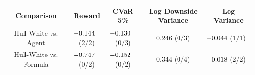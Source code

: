 \begingroup
\renewcommand{\arraystretch}{1.18}
\setlength{\tabcolsep}{7pt}
\begin{tabular}{@{}ccccc@{}}
\toprule
Comparison & Reward & CVaR 5\% & Log Downside Variance & Log Variance \\
\midrule
Hull-White vs. Agent & $\mathllap{-}0.144$ (2/2) & $\mathllap{-}0.130$ (0/3) & $0.246$ (0/3) & $\mathllap{-}0.044$ (1/1) \\
Hull-White vs. Formula & $\mathllap{-}0.747$ (0/2) & $\mathllap{-}0.152$ (0/2) & $0.344$ (0/4) & $\mathllap{-}0.018$ (2/2) \\
\bottomrule
\end{tabular}
\endgroup

